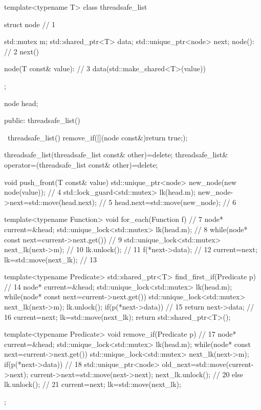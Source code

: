 \begin{cpp}
template<typename T>
class threadsafe_list
{
  struct node  // 1
  {
    std::mutex m;
    std::shared_ptr<T> data;
    std::unique_ptr<node> next;
    node():  // 2
      next()
    {}

    node(T const& value):  // 3
      data(std::make_shared<T>(value))
    {}
  };

  node head;

public:
  threadsafe_list()
  {}

  ~threadsafe_list()
  {
    remove_if([](node const&){return true;});
  }

  threadsafe_list(threadsafe_list const& other)=delete;
  threadsafe_list& operator=(threadsafe_list const& other)=delete;

  void push_front(T const& value)
  {
    std::unique_ptr<node> new_node(new node(value));  // 4
    std::lock_guard<std::mutex> lk(head.m);
    new_node->next=std::move(head.next);  // 5
    head.next=std::move(new_node);  // 6
  }

  template<typename Function>
  void for_each(Function f)  // 7
  {
    node* current=&head;
    std::unique_lock<std::mutex> lk(head.m);  // 8
    while(node* const next=current->next.get())  // 9
    {
      std::unique_lock<std::mutex> next_lk(next->m);  // 10
      lk.unlock();  // 11
      f(*next->data);  // 12
      current=next;
      lk=std::move(next_lk);  // 13
    }
  }

  template<typename Predicate>
  std::shared_ptr<T> find_first_if(Predicate p)  // 14
  {
    node* current=&head;
    std::unique_lock<std::mutex> lk(head.m);
    while(node* const next=current->next.get())
    {
      std::unique_lock<std::mutex> next_lk(next->m);
      lk.unlock();
      if(p(*next->data))  // 15
      {
         return next->data;  // 16
      }
      current=next;
      lk=std::move(next_lk);
    }
    return std::shared_ptr<T>();
  }

  template<typename Predicate>
  void remove_if(Predicate p)  // 17
  {
    node* current=&head;
    std::unique_lock<std::mutex> lk(head.m);
    while(node* const next=current->next.get())
    {
      std::unique_lock<std::mutex> next_lk(next->m);
      if(p(*next->data))  // 18
      {
        std::unique_ptr<node> old_next=std::move(current->next);
        current->next=std::move(next->next);
        next_lk.unlock();
      }  // 20
      else
      {
        lk.unlock();  // 21
        current=next;
        lk=std::move(next_lk);
      }
    }
  }
};
\end{cpp}

